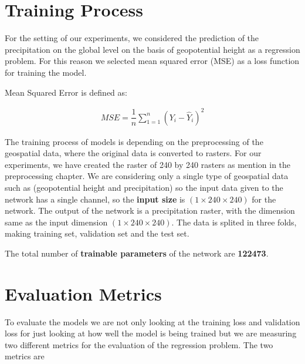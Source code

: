 \newpage

\section{Training Process}

For the setting of our experiments, we considered the prediction of the precipitation on the global level on the basis of geopotential height as a regression problem. For this reason we selected mean squared error (MSE) as a loss function for training the model.

Mean Squared Error is defined as:

\begin{gather*}
    MSE = \dfrac{1}{n}\sum_{1 = 1}^{n}(Y_i-\hat{Y}_i )^2
\end{gather*}

The training process of models is depending on the preprocessing of the geospatial data, where the original data is converted to rasters. For our experiments, we have created the raster of 240 by 240 rasters as mention in the preprocessing chapter.
We are considering only a single type of geospatial data such as (geopotential height and precipitation) so the input data given to the network has a single channel, so the \textbf{input size} is $(1 \times 240  \times 240)$ for the network.
The output of the network is a precipitation raster, with the dimension same as the input dimension $(1 \times 240  \times 240)$. The data is splited in three folds, making training set, validation set and the test set.

The total number of \textbf{trainable parameters} of the network are \textbf{122473}.
\section{Evaluation Metrics}

To evaluate the models we are not only looking at the training loss and validation loss for just looking at how well the model is being trained but we are measuring two different metrics for the evaluation of the regression problem.
The two metrics are

